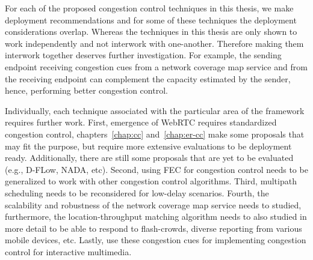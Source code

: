 




For each of the proposed congestion control techniques in this thesis, we make
deployment recommendations and for some of these techniques the deployment
considerations overlap. Whereas the techniques in this thesis are only shown
to work independently and not interwork with one-another. Therefore making
them interwork together deserves further investigation. For example, the
sending endpoint receiving congestion cues from a network coverage map service
and from the receiving endpoint can complement the capacity estimated by the
sender, hence, performing better congestion control.

Individually, each technique associated with the particular area of the
framework requires further work. First, emergence of WebRTC requires
standardized congestion control, chapters~\ref{chap:cc} and~\ref{chap:er-cc}
make some proposals that may fit the purpose, but require more extensive
evaluations to be deployment ready. Additionally, there are still some
proposals that are yet to be evaluated (e.g., D-FLow, NADA, etc). Second,
using FEC for congestion control needs to be generalized to work with other
congestion control algorithms. Third, multipath scheduling needs to be
reconsidered for low-delay scenarios. Fourth, the scalability and robustness
of the network coverage map service needs to studied, furthermore, the
location-throughput matching algorithm needs to also studied in more detail to
be able to respond to flash-crowds, diverse reporting from various mobile
devices, etc. Lastly, use these congestion cues for implementing congestion
control for interactive multimedia.


